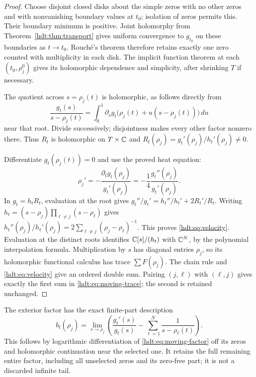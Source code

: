 \documentclass[11pt]{article}
\begin{document}
\begin{proof}
Choose disjoint closed disks about the simple zeros with no other
zeros and with nonvanishing boundary values at $t_0$; isolation
of zeros permits this. Their boundary minimum is positive.
Joint holomorphy from Theorem~\ref{hdt:thm:transport} gives uniform
convergence to $g_{t_0}$ on these boundaries as $t\to t_0$.
Rouch\'e's theorem therefore retains exactly one zero counted with
multiplicity in each disk. The implicit function theorem at each
$(t_0,\rho_j^0)$ gives its holomorphic dependence and simplicity,
after shrinking $T$ if necessary.

The quotient across $s=\rho_j(t)$ is holomorphic, as follows
directly from
\[
\frac{g_t(s)}{s-\rho_j(t)}
=\int_0^1\partial_sg_t\bigl(\rho_j(t)
+u(s-\rho_j(t))\bigr)\,du
\]
near that root. Divide successively; disjointness makes every
other factor nonzero there. Thus $R_t$ is holomorphic on
$T\times\mathbb C$ and
$R_t(\rho_j)=g_t'(\rho_j)/h_t'(\rho_j)\ne0$.

Differentiate $g_t(\rho_j(t))=0$ and use the proved heat equation:
\[
\rho_j'=-\frac{\partial_tg_t(\rho_j)}{g_t'(\rho_j)}
=-\frac14\frac{g_t''(\rho_j)}{g_t'(\rho_j)}.
\]
In $g_t=h_tR_t$, evaluation at the root gives
$g_t''/g_t'=h_t''/h_t'+2R_t'/R_t$.
Writing $h_t=(s-\rho_j)\prod_{\ell\ne j}(s-\rho_\ell)$ gives
$h_t''(\rho_j)/h_t'(\rho_j)
=2\sum_{\ell\ne j}(\rho_j-\rho_\ell)^{-1}$.
This proves \eqref{hdt:eq:velocity}. Evaluation at the distinct roots
identifies $\mathbb C[s]/(h_t)$ with $\mathbb C^N$, by the polynomial
interpolation formula. Multiplication by $s$ has diagonal entries
$\rho_j$, so its holomorphic functional calculus has trace $\sum F(\rho_j)$.
The chain rule and \eqref{hdt:eq:velocity} give an ordered double sum.
Pairing $(j,\ell)$ with $(\ell,j)$ gives exactly the first sum in
\eqref{hdt:eq:moving-trace}; the second is retained unchanged.
\end{proof}

The exterior factor has the exact finite-part description
\begin{equation}\label{hdt:eq:exterior-finite-part}
b_t(\rho_j)=\lim_{s\to\rho_j}
\left(\frac{g_t'(s)}{g_t(s)}-
\sum_{\ell=1}^N\frac1{s-\rho_\ell(t)}\right).
\end{equation}
This follows by logarithmic differentiation of \eqref{hdt:eq:moving-factor}
off its zeros and holomorphic continuation near the selected one.
It retains the full remaining entire factor, including all unselected
zeros and its zero-free part; it is not a discarded infinite tail.
\end{document}
